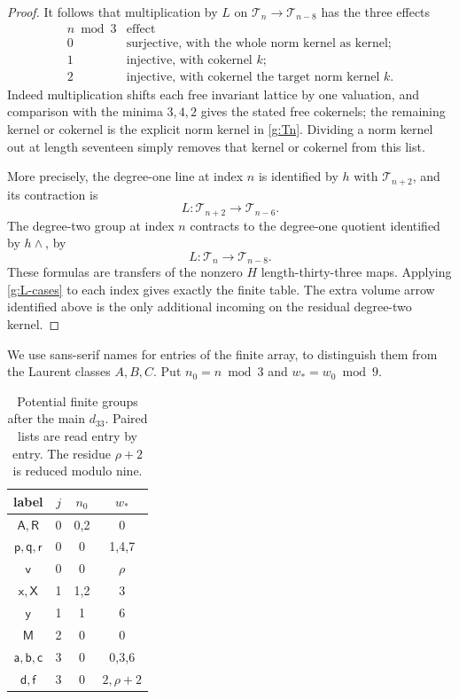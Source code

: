 \documentclass[11pt]{article}
\theoremstyle{definition}
\theoremstyle{remark}
\numberwithin{equation}{section}
\begin{document}
\begin{proof}
It follows that multiplication by $L$ on
$\mathcal T_n\to\mathcal T_{n-8}$ has the three
effects
\begin{equation}\label{g:L-cases}
\begin{array}{c|l}
 n\bmod3&\text{effect}\\\hline
 0&\text{surjective, with the whole norm kernel as kernel;}\\
 1&\text{injective, with cokernel }k;\\
 2&\text{injective, with cokernel the target norm kernel }k.
\end{array}
\end{equation}
Indeed multiplication shifts each free invariant lattice
by one valuation, and comparison with the minima
$3,4,2$ gives the stated free cokernels; the remaining
kernel or cokernel is the explicit norm kernel in
\eqref{g:Tn}.  Dividing a norm kernel out at length
seventeen simply removes that kernel or cokernel from
this list.

More precisely, the degree-one line at index $n$ is
identified by $h$ with $\mathcal T_{n+2}$, and its
contraction is
\[
 L:\mathcal T_{n+2}\longrightarrow\mathcal T_{n-6}.
\]
The degree-two group at index $n$ contracts to the
degree-one quotient identified by $h\wedge$, by
\[
 L:\mathcal T_n\longrightarrow\mathcal T_{n-8}.
\]
These formulas are transfers of the nonzero $H$
length-thirty-three maps.  Applying
\eqref{g:L-cases} to each index gives exactly the
finite table.  The extra volume arrow identified above
is the only additional incoming on the residual
degree-two kernel.
\end{proof}

We use sans-serif names for entries of the finite array, to
distinguish them from the Laurent classes $A,B,C$.  Put
$n_0=n\bmod3$ and $w_*=w_0\bmod9$.
\begin{table}[htbp]

\begin{tabular}{c|c|c|c}
\toprule
label&$j$&$n_0$&$w_*$\\\midrule
$\mathsf A,\mathsf R$&0&0,2&0\\
$\mathsf p,\mathsf q,\mathsf r$&0&0&1,4,7\\
$\mathsf v$&0&0&$\rho$\\
$\mathsf x,\mathsf X$&1&1,2&3\\
$\mathsf y$&1&1&6\\
$\mathsf M$&2&0&0\\
$\mathsf a,\mathsf b,\mathsf c$&3&0&0,3,6\\
$\mathsf d,\mathsf f$&3&0&$2,\rho+2$\\\bottomrule
\end{tabular}
\caption{Potential finite groups after the main $d_{33}$.
Paired lists are read entry by entry.  The residue $\rho+2$
is reduced modulo nine.}\label{g:finite-table}
\end{table}
\end{document}
